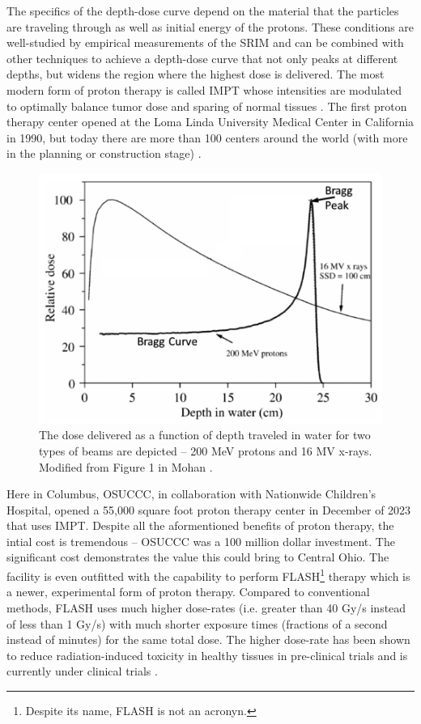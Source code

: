 The specifics of the depth-dose curve depend on the material that the particles are traveling through as well as initial energy of the protons. These conditions are well-studied by empirical measurements of the \gls{SRIM} \cite{Ziegler_2010_SRIM} and can be combined with other techniques to achieve a depth-dose curve that not only peaks at different depths, but widens the region where the highest dose is delivered. The most modern form of proton therapy is called \gls{IMPT} whose intensities are modulated to optimally balance tumor dose and sparing of normal tissues \cite{Mohan_2022_PRO}. The first proton therapy center opened at the Loma Linda University Medical Center in California in 1990, but today there are more than 100 centers around the world (with more in the planning or construction stage) \cite{Mohan_2022_PRO}. 

\begin{figure}
	\centering
	\includegraphics[width=0.75\linewidth]{planning/images/bragg_curve.PNG}
	\caption{The dose delivered as a function of depth traveled in water for two types of beams are depicted -- 200 MeV protons and 16 MV x-rays. Modified from Figure 1 in Mohan \cite{Mohan_2022_PRO}.}
	\label{fig:bragg_curve}
\end{figure}
 
Here in Columbus, \gls{OSUCCC}, in collaboration with Nationwide Children's Hospital, opened a 55,000 square foot proton therapy center in December of 2023 \cite{OSU_CCC} that uses \gls{IMPT}. Despite all the aformentioned benefits of proton therapy, the intial cost is tremendous -- \gls{OSUCCC} was a 100 million dollar investment. The significant cost demonstrates the value this could bring to Central Ohio. The facility is even outfitted with the capability to perform FLASH\footnote{Despite its name, FLASH is not an acronyn.} therapy which is a newer, experimental form of proton therapy. Compared to conventional methods, FLASH uses much higher dose-rates (i.e. greater than 40 Gy/s instead of less than 1 Gy/s) with much shorter exposure times (fractions of a second instead of minutes) for the same total dose. The higher dose-rate has been shown to reduce radiation-induced toxicity in healthy tissues in pre-clinical trials \cite{Matuszak_2022_Onc} and is currently under clinical trials \cite{OSU_CCC}. 

